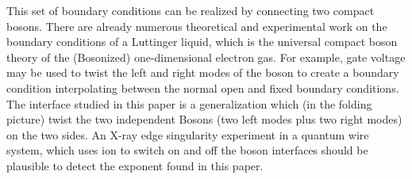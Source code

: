 This set of boundary conditions can be realized by connecting two compact bosons. There are already numerous theoretical and experimental work on the boundary conditions of a Luttinger liquid\cite{schmeltzer_zero_1999,anfuso_luttinger_2003,voit_bounded_2000,fabrizio_interacting_1995,egger_applying_1998}, which is the universal compact boson theory of the (Bosonized) one-dimensional electron gas\cite{giamarchi_quantum_2015}. For example, gate voltage \cite{egger_applying_1998} may be used to twist the left and right modes of the boson to create a boundary condition interpolating between the normal open and fixed boundary conditions. The interface studied in this paper is a generalization which (in the folding picture) twist the two independent Bosons (two left modes plus two right modes) on the two sides. An X-ray edge singularity experiment in a quantum wire system, which uses ion to switch on and off the boson interfaces should be plausible to detect the exponent found in this paper. 


